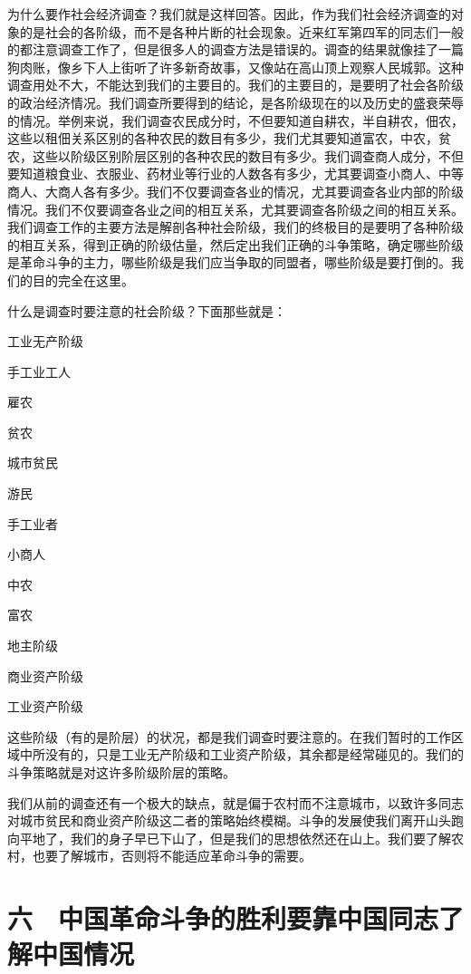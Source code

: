 为什么要作社会经济调查？我们就是这样回答。因此，作为我们社会经济调查的对象的是社会的各阶级，而不是各种片断的社会现象。近来红军第四军的同志们一般的都注意调查工作了，但是很多人的调查方法是错误的。调查的结果就像挂了一篇狗肉账，像乡下人上街听了许多新奇故事，又像站在高山顶上观察人民城郭。这种调查用处不大，不能达到我们的主要目的。我们的主要目的，是要明了社会各阶级的政治经济情况。我们调查所要得到的结论，是各阶级现在的以及历史的盛衰荣辱的情况。举例来说，我们调查农民成分时，不但要知道自耕农，半自耕农，佃农，这些以租佃关系区别的各种农民的数目有多少，我们尤其要知道富农，中农，贫农，这些以阶级区别阶层区别的各种农民的数目有多少。我们调查商人成分，不但要知道粮食业、衣服业、药材业等行业的人数各有多少，尤其要调查小商人、中等商人、大商人各有多少。我们不仅要调查各业的情况，尤其要调查各业内部的阶级情况。我们不仅要调查各业之间的相互关系，尤其要调查各阶级之间的相互关系。我们调查工作的主要方法是解剖各种社会阶级，我们的终极目的是要明了各种阶级的相互关系，得到正确的阶级估量，然后定出我们正确的斗争策略，确定哪些阶级是革命斗争的主力，哪些阶级是我们应当争取的同盟者，哪些阶级是要打倒的。我们的目的完全在这里。

什么是调查时要注意的社会阶级？下面那些就是：

工业无产阶级

手工业工人

雇农

贫农

城市贫民

游民

手工业者

小商人

中农

富农

地主阶级

商业资产阶级

工业资产阶级

这些阶级（有的是阶层）的状况，都是我们调查时要注意的。在我们暂时的工作区域中所没有的，只是工业无产阶级和工业资产阶级，其余都是经常碰见的。我们的斗争策略就是对这许多阶级阶层的策略。

我们从前的调查还有一个极大的缺点，就是偏于农村而不注意城市，以致许多同志对城市贫民和商业资产阶级这二者的策略始终模糊。斗争的发展使我们离开山头跑向平地了，我们的身子早已下山了，但是我们的思想依然还在山上。我们要了解农村，也要了解城市，否则将不能适应革命斗争的需要。

\section{六　中国革命斗争的胜利要靠中国同志了解中国情况}

